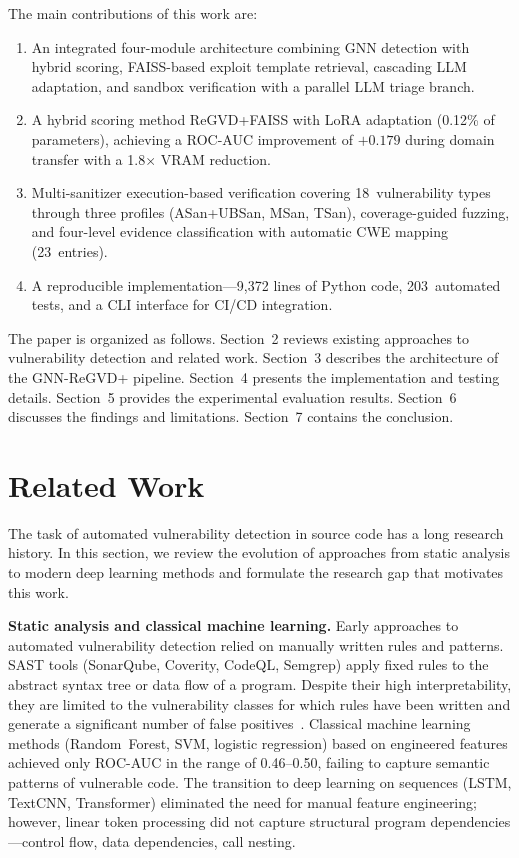 \documentclass[runningheads]{llncs}
\begin{document}
The main contributions of this work are:

\begin{enumerate}
    \item An integrated four-module architecture combining GNN detection with hybrid scoring, FAISS-based exploit template retrieval, cascading LLM adaptation, and sandbox verification with a parallel LLM triage branch.
    \item A hybrid scoring method ReGVD+FAISS with LoRA adaptation (0.12\% of parameters), achieving a ROC-AUC improvement of $+0.179$ during domain transfer with a 1.8$\times$ VRAM reduction.
    \item Multi-sanitizer execution-based verification covering 18~vulnerability types through three profiles (ASan+UBSan, MSan, TSan), coverage-guided fuzzing, and four-level evidence classification with automatic CWE mapping (23~entries).
    \item A reproducible implementation---9,372 lines of Python code, 203~automated tests, and a CLI interface for CI/CD integration.
\end{enumerate}

The paper is organized as follows. Section~2 reviews existing approaches to vulnerability detection and related work. Section~3 describes the architecture of the GNN-ReGVD+ pipeline. Section~4 presents the implementation and testing details. Section~5 provides the experimental evaluation results. Section~6 discusses the findings and limitations. Section~7 contains the conclusion.


\section{Related Work}

The task of automated vulnerability detection in source code has a long research history. In this section, we review the evolution of approaches from static analysis to modern deep learning methods and formulate the research gap that motivates this work.

\textbf{Static analysis and classical machine learning.}
Early approaches to automated vulnerability detection relied on manually written rules and patterns. SAST tools (SonarQube, Coverity, CodeQL, Semgrep) apply fixed rules to the abstract syntax tree or data flow of a program. Despite their high interpretability, they are limited to the vulnerability classes for which rules have been written and generate a significant number of false positives~\cite{sultana2024}. Classical machine learning methods (Random~Forest, SVM, logistic regression) based on engineered features achieved only ROC-AUC in the range of 0.46--0.50, failing to capture semantic patterns of vulnerable code. The transition to deep learning on sequences (LSTM, TextCNN, Transformer) eliminated the need for manual feature engineering; however, linear token processing did not capture structural program dependencies---control flow, data dependencies, call nesting.
\end{document}
